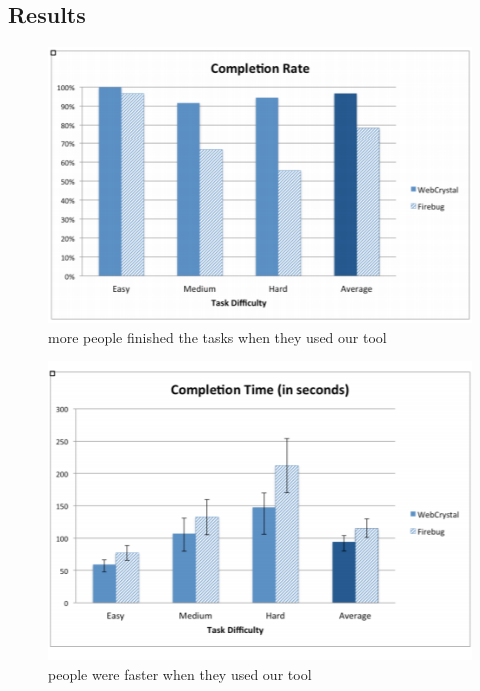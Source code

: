 \documentclass{sigchi}
\begin{document}
\subsection{Results}
\begin{figure}
    \centering
    \includegraphics[width=\columnwidth]{figures/completion_rates.PNG}
    \caption{more people finished the tasks when they used our tool}  
    \label{fig:xray_screenshot}
\end{figure}

\begin{figure}
    \centering
    \includegraphics[width=\columnwidth]{figures/completion_time.PNG}
    \caption{people were faster when they used our tool}  
    \label{fig:xray_screenshot}
\end{figure}
\end{document}
